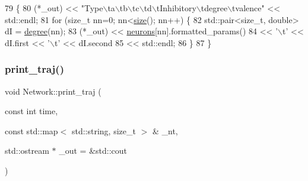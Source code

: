 \begin{DoxyCode}
79                                            \{
80     (*\_out) << \textcolor{stringliteral}{"Type\(\backslash\)ta\(\backslash\)tb\(\backslash\)tc\(\backslash\)td\(\backslash\)tInhibitory\(\backslash\)tdegree\(\backslash\)tvalence"} << std::endl;
81     \textcolor{keywordflow}{for} (\textcolor{keywordtype}{size\_t} nn=0; nn<\hyperlink{classNetwork_a41c54d12d861883170b5c5abca3a7bc8}{size}(); nn++) \{
82         std::pair<size\_t, double> dI = \hyperlink{classNetwork_a313da14a6a430ae14e3943dba78edb61}{degree}(nn);
83         (*\_out) << \hyperlink{classNetwork_a1b7832bc2c7b8855cdc3b2d6329eff9d}{neurons}[nn].formatted\_params() 
84                 << \textcolor{charliteral}{'\(\backslash\)t'} << dI.first << \textcolor{charliteral}{'\(\backslash\)t'} << dI.second
85                 << std::endl;
86     \}
87 \}
\end{DoxyCode}
\mbox{\label{classNetwork_ae460d31557bba058fdf66e4fe5feb801}} 
\subsubsection{\texorpdfstring{print\+\_\+traj()}{print\_traj()}}
{\footnotesize\ttfamily void Network\+::print\+\_\+traj (\begin{DoxyParamCaption}\item[{const int}]{time,  }\item[{const std\+::map$<$ std\+::string, size\+\_\+t $>$ \&}]{\+\_\+nt,  }\item[{std\+::ostream $\ast$}]{\+\_\+out = {\ttfamily \&std\+:\+:cout} }\end{DoxyParamCaption})}


